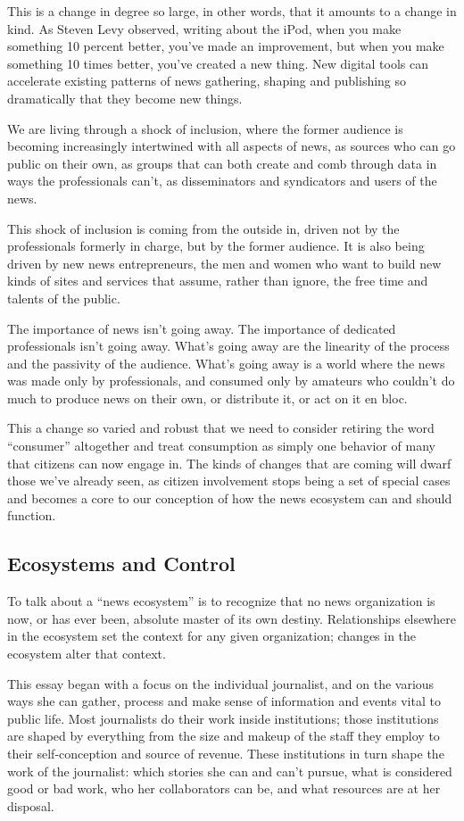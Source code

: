 This is a change in degree so large, in other words, that it amounts to a change in
kind. As Steven Levy observed, writing about the iPod, when you make something
10 percent better, you’ve made an improvement, but when you make
something 10 times better, you’ve created a new thing. New digital tools can
accelerate existing patterns of news gathering, shaping and publishing so dramatically
that they become new things.

We are living through a shock of inclusion, where the former audience is
becoming increasingly intertwined with all aspects of news, as sources who
can go public on their own, as groups that can both create and comb through
data in ways the professionals can’t, as disseminators and syndicators and users
of the news.

This shock of inclusion is coming from the outside in, driven not by the professionals
formerly in charge, but by the former audience. It is also being driven
by new news entrepreneurs, the men and women who want to build new kinds
of sites and services that assume, rather than ignore, the free time and talents of
the public.

The importance of news isn’t going away. The importance of dedicated professionals
isn’t going away. What’s going away are the linearity of the process and the
passivity of the audience. What’s going away is a world where the news was made
only by professionals, and consumed only by amateurs who couldn’t do much to
produce news on their own, or distribute it, or act on it en bloc.

This a change so varied and robust that we need to consider retiring the word
``consumer'' altogether and treat consumption as simply one behavior of many
that citizens can now engage in. The kinds of changes that are coming will dwarf
those we’ve already seen, as citizen involvement stops being a set of special cases
and becomes a core to our conception of how the news ecosystem can and
should function.

\subsection{Ecosystems and Control}
To talk about a ``news ecosystem'' is to recognize that no news organization is
now, or has ever been, absolute master of its own destiny. Relationships elsewhere
in the ecosystem set the context for any given organization; changes in the ecosystem
alter that context.

This essay began with a focus on the individual journalist, and on the various
ways she can gather, process and make sense of information and events vital to
public life. Most journalists do their work inside institutions; those institutions are
shaped by everything from the size and makeup of the staff they employ to their
self-conception and source of revenue. These institutions in turn shape the work
of the journalist: which stories she can and can’t pursue, what is considered good
or bad work, who her collaborators can be, and what resources are at her disposal.

